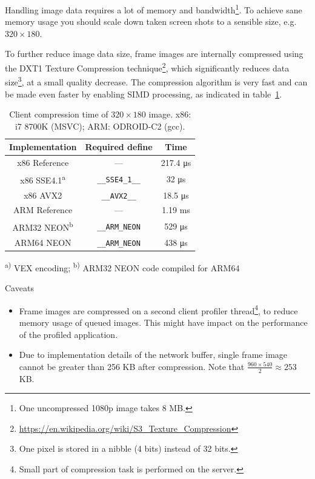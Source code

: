 \documentclass[hidelinks,titlepage,a4paper]{article}
\begin{document}
Handling image data requires a lot of memory and bandwidth\footnote{One uncompressed 1080p image takes 8 MB.}. To achieve sane memory usage you should scale down taken screen shots to a sensible size, e.g. $320\times180$.

To further reduce image data size, frame images are internally compressed using the DXT1 Texture Compression technique\footnote{\url{https://en.wikipedia.org/wiki/S3_Texture_Compression}}, which significantly reduces data size\footnote{One pixel is stored in a nibble (4 bits) instead of 32 bits.}, at a small quality decrease. The compression algorithm is very fast and can be made even faster by enabling SIMD processing, as indicated in table~\ref{EtcSimd}.

\begin{table}[h]
\centering
\begin{tabular}[h]{c|c|c}
\textbf{Implementation} & \textbf{Required define} & \textbf{Time} \\ \hline
x86 Reference & --- & 217.4 \si{\micro\second} \\
x86 SSE4.1\textsuperscript{a} & \texttt{\_\_SSE4\_1\_\_} & 32 \si{\micro\second} \\
x86 AVX2 & \texttt{\_\_AVX2\_\_} & 18.5 \si{\micro\second} \\
ARM Reference & --- & 1.19 \si{\milli\second} \\
ARM32 NEON\textsuperscript{b} & \texttt{\_\_ARM\_NEON} & 529 \si{\micro\second} \\
ARM64 NEON & \texttt{\_\_ARM\_NEON} & 438 \si{\micro\second}
\end{tabular}

\vspace{1em}
\textsuperscript{a)} VEX encoding; \hspace{0.5em} \textsuperscript{b)} ARM32 NEON code compiled for ARM64
\caption{Client compression time of $320\times180$ image. x86: i7 8700K (MSVC); ARM: ODROID-C2 (gcc).}
\label{EtcSimd}
\end{table}

\begin{bclogo}[
noborder=true,
couleur=black!5,
logo=\bcattention
]{Caveats}
\begin{itemize}
\item Frame images are compressed on a second client profiler thread\footnote{Small part of compression task is performed on the server.}, to reduce memory usage of queued images. This might have impact on the performance of the profiled application.
\item Due to implementation details of the network buffer, single frame image cannot be greater than 256 KB after compression. Note that $\frac{960\times540}{2} \approx 253$ KB.
\end{itemize}
\end{bclogo}
\end{document}
